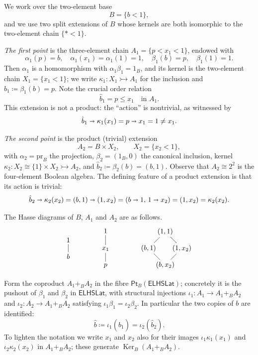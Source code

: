 \documentclass[reqno,a4paper]{amsart}
\theoremstyle{remark}
\theoremstyle{definition}
\newcommand{\iimplies}{\shortrightarrow}
\DeclareMathOperator{\Ker}{Ker}
\newcommand{\ELHSLat}{\ensuremath{\mathsf{ELHSLat}}}
\newcommand{\Pt}{\ensuremath{\mathsf{Pt}}}
\renewcommand{\leq}{\leqslant}
\begin{document}
We work over the two-element base
\[
	B = \{b < 1\},
\]
and we use two split extensions of \(B\) whose kernels are both isomorphic to the two-element chain \(\{\ast < 1\}\).

\smallskip
\noindent\emph{The first point} is the three-element chain \(A_1 = \{p < x_1 < 1\}\), endowed with
\[
	\alpha_1(p) = b, \quad \alpha_1(x_1) = \alpha_1(1) = 1, \quad \beta_1(b) = p, \quad \beta_1(1) = 1.
\]
Then \(\alpha_1\) is a homomorphism with \(\alpha_1\beta_1 = 1_B\), and its kernel is the two-element chain \(X_1 = \{x_1 < 1\}\); we write \(\kappa_1\colon X_1 \rightarrowtail A_1\) for the inclusion and \(\hat b_1 \coloneq \beta_1(b) = p\). Note the crucial order relation
\begin{equation}\label{eq order in A1}
	\hat b_1 = p \leq x_1 \quad \text{in } A_1.
\end{equation}
This extension is not a product: the ``action'' is nontrivial, as witnessed by
\[
	\hat b_1 \iimplies \kappa_1(x_1) = p \iimplies x_1 = 1 \neq x_1.
\]

\smallskip
\noindent\emph{The second point} is the product (trivial) extension
\[
	A_2 = B \times X_2, \qquad X_2 = \{x_2 < 1\},
\]
with \(\alpha_2 = \mathrm{pr}_B\) the projection, \(\beta_2 = (1_B, 0)\) the canonical inclusion, kernel \(\kappa_2 \colon X_2 \cong \{1\}\times X_2 \rightarrowtail A_2\), and \(\hat b_2 \coloneq \beta_2(b) = (b,1)\). Observe that \(A_2 \cong 2^2\) is the four-element Boolean algebra. The defining feature of a product extension is that its action is trivial:
\begin{equation}\label{eq trivial action}
	\hat b_2 \iimplies \kappa_2(x_2) = (b,1) \iimplies (1,x_2) = (b \iimplies 1, \, 1 \iimplies x_2) = (1, x_2) = \kappa_2(x_2).
\end{equation}

The Hasse diagrams of \(B\), \(A_1\) and \(A_2\) are as follows.
\[
	\vcenter{\xymatrix@!=0ex{
	1 \\ b \ar@{-}[u]
	}}
	\qquad\qquad
	\vcenter{\xymatrix@!=0ex{
	1 \\ x_1 \ar@{-}[u] \\ p \ar@{-}[u]
	}}
	\qquad\qquad
	\vcenter{\xymatrix@!=0ex{
	& (1,1) & \\
	(b,1) \ar@{-}[ur] & & (1,x_2) \ar@{-}[ul] \\
	& (b,x_2) \ar@{-}[ul] \ar@{-}[ur] &
	}}
\]

Form the coproduct \(A_1 +_B A_2\) in the fibre \(\Pt_B(\ELHSLat)\); concretely it is the pushout of \(\beta_1\) and \(\beta_2\) in \(\ELHSLat\), with structural injections \(\iota_1 \colon A_1 \to A_1 +_B A_2\) and \(\iota_2 \colon A_2 \to A_1 +_B A_2\) satisfying \(\iota_1\beta_1 = \iota_2\beta_2\). In particular the two copies of \(b\) are identified:
\[
	\hat b \coloneq \iota_1(\hat b_1) = \iota_2(\hat b_2).
\]
To lighten the notation we write \(x_1\) and \(x_2\) also for their images \(\iota_1\kappa_1(x_1)\) and \(\iota_2\kappa_2(x_2)\) in \(A_1 +_B A_2\); these generate \(\Ker_B(A_1 +_B A_2)\).
\end{document}
